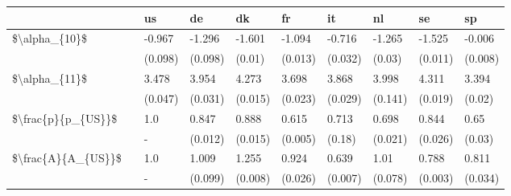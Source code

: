 \begin{tabular}{llllllllll}
\toprule
                   & {} &       us &       de &       dk &       fr &       it &       nl &       se &       sp \\
\midrule
\$\textbackslash alpha\_\{10\}\$ & {} &   -0.967 &   -1.296 &   -1.601 &   -1.094 &   -0.716 &   -1.265 &   -1.525 &   -0.006 \\
                   & {} &  (0.098) &  (0.098) &   (0.01) &  (0.013) &  (0.032) &   (0.03) &  (0.011) &  (0.008) \\
\$\textbackslash alpha\_\{11\}\$ & {} &    3.478 &    3.954 &    4.273 &    3.698 &    3.868 &    3.998 &    4.311 &    3.394 \\
                   & {} &  (0.047) &  (0.031) &  (0.015) &  (0.023) &  (0.029) &  (0.141) &  (0.019) &   (0.02) \\
\$\textbackslash frac\{p\}\{p\_\{US\}\}\$ & {} &      1.0 &    0.847 &    0.888 &    0.615 &    0.713 &    0.698 &    0.844 &     0.65 \\
                   & {} &        - &  (0.012) &  (0.015) &  (0.005) &   (0.18) &  (0.021) &  (0.026) &   (0.03) \\
\$\textbackslash frac\{A\}\{A\_\{US\}\}\$ & {} &      1.0 &    1.009 &    1.255 &    0.924 &    0.639 &     1.01 &    0.788 &    0.811 \\
                   & {} &        - &  (0.099) &  (0.008) &  (0.026) &  (0.007) &  (0.078) &  (0.003) &  (0.034) \\
\bottomrule
\end{tabular}
